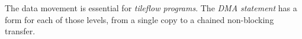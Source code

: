 The data movement is essential for \emph{tileflow programs}. The \emph{DMA statement} has a form for each of those levels, from a single copy to a chained non-blocking transfer.
